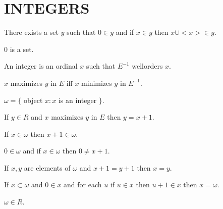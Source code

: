 \documentclass[a4paper,draft]{amsproc}
\begin{document}
\section{INTEGERS}
\begin{forthel}

\begin{axiom}[VIII]
There exists a set $y$ such that $0 \in y$ and if $x \in y$ then $x \cup <x> \in y$.
\end{axiom}

\begin{lemma}
0 is a set.
\end{lemma}

\begin{definition}[129]
An integer is an ordinal $x$ such that $E^{-1}$ wellorders $x$.
\end{definition}

\begin{definition}[130]
$x$ maximizes $y$ in $E$ iff $x$ minimizes $y$ in $E^{-1}$.
\end{definition}

\begin{definition}[131]
$\omega = \{$ object $x : x$ is an integer $\}.$
\end{definition}


\begin{theorem}[133]
If $y \in R$ and $x$ maximizes $y$ in $E$ then $y = x + 1$.
\end{theorem}

\begin{theorem}[134]
If $x \in \omega$ then $x + 1 \in \omega$.
\end{theorem}

\begin{theorem}[135]
$0 \in \omega$ and if $x \in \omega$ then $0 \neq x + 1$.
\end{theorem}

\begin{theorem}[136]
If $x, y$ are elements of $\omega$ and $x + 1 = y + 1$ then $x = y$.
\end{theorem}

\begin{theorem}[137]
If $x \subset \omega$ and $0 \in x$ and for each $u$ if $u \in x$ then $u + 1 \in x$ then $x = \omega$.
\end{theorem}

\begin{theorem}[138]
$\omega \in R$.
\end{theorem}

\end{forthel}
\end{document}
